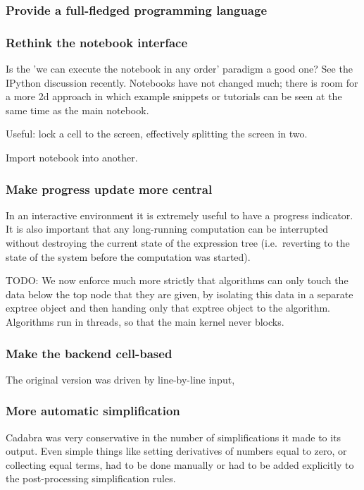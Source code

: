\documentclass[11pt]{article}
\begin{document}
\subsubsection{Provide a full-fledged programming language}



\subsubsection{Rethink the notebook interface}

Is the 'we can execute the notebook in any order' paradigm a good one?
See the IPython discussion recently. Notebooks have not changed much;
there is room for a more 2d approach in which example snippets or
tutorials can be seen at the same time as the main notebook.

Useful: lock a cell to the screen, effectively splitting the screen in
two. 

Import notebook into another. 

\subsubsection{Make progress update more central}

In an interactive environment it is extremely useful to have a
progress indicator. It is also important that any long-running
computation can be interrupted without destroying the current state of
the expression tree (i.e.~reverting to the state of the system before
the computation was started). 

TODO: We now enforce much more strictly that algorithms can only touch the
data below the top node that they are given, by isolating this data in
a separate exptree object and then handing only that exptree object to
the algorithm. Algorithms run in threads, so that the main kernel
never blocks.

\subsubsection{Make the backend cell-based}

The original version was driven by line-by-line input, 

\subsubsection{More automatic simplification}

Cadabra was very conservative in the number of simplifications it made
to its output. Even simple things like setting derivatives of
numbers equal to zero, or collecting equal terms, had to be done
manually or had to be added explicitly to the post-processing
simplification rules.
\end{document}
